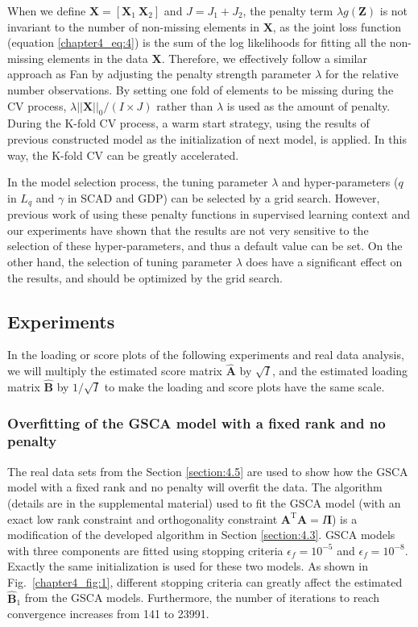 When we define $\mathbf{X}=[\mathbf{X}_1 ~ \mathbf{X}_2]$ and $J=J_1+J_2$, the penalty term $\lambda g(\mathbf{Z})$ is not invariant to the number of non-missing elements in $\mathbf{X}$, as the joint loss function (equation \ref{chapter4_eq:4}) is the sum of the log likelihoods for fitting all the non-missing elements in the data $\mathbf{X}$. Therefore, we effectively follow a similar approach as Fan \cite{fan2001variable} by adjusting the penalty strength parameter $\lambda$ for the relative number observations. By setting one fold of elements to be missing during the CV process, $\lambda||\mathbf{X}||_0/(I\times J)$ rather than $\lambda$ is used as the amount of penalty. During the K-fold CV process, a warm start strategy, using the results of previous constructed model as the initialization of next model, is applied. In this way, the K-fold CV can be greatly accelerated.

In the model selection process, the tuning parameter $\lambda$ and hyper-parameters ($q$ in $L_{q}$ and $\gamma$ in SCAD and GDP) can be selected by a grid search. However, previous work of using these penalty functions in supervised learning context \cite{fu1998penalized,fan2001variable,armagan2013generalized} and our experiments have shown that the results are not very sensitive to the selection of these hyper-parameters, and thus a default value can be set. On the other hand, the selection of tuning parameter $\lambda$ does have a significant effect on the results, and should be optimized by the grid search.

\subsection{Experiments}
In the loading or score plots of the following experiments and real data analysis, we will multiply the estimated score matrix $\hat{\mathbf{A}}$ by $\sqrt{I}$, and the estimated loading matrix $\hat{\mathbf{B}}$ by $1/\sqrt{I}$ to make the loading and score plots have the same scale.

\subsubsection{Overfitting of the GSCA model with a fixed rank and no penalty}
The real data sets from the Section \ref{section:4.5} are used to show how the GSCA model with a fixed rank and no penalty will overfit the data. The algorithm (details are in the supplemental material) used to fit the GSCA model (with an exact low rank constraint and orthogonality constraint $\mathbf{A}^{\text{T}}\mathbf{A} = I\mathbf{I}$) is a modification of the developed algorithm in Section \ref{section:4.3}. GSCA models with three components are fitted using stopping criteria $\epsilon_f = 10^{-5}$ and $\epsilon_f=10^{-8}$. Exactly the same initialization is used for these two models. As shown in Fig.~\ref{chapter4_fig:1}, different stopping criteria can greatly affect the estimated $\hat{\mathbf{B}}_1$ from the GSCA models. Furthermore, the number of iterations to reach convergence increases from 141 to 23991.

